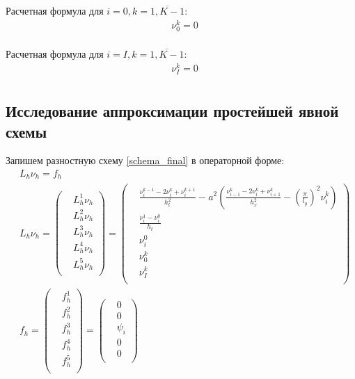 {{		Расчетная формула для $i =  0, k =  \overline{ 1, K-1}$:
		\begin{equation} \label{solution_i0}
		\begin{split}
		& \nu^{k}_0 = 0 \\
		\end{split}
		\end{equation}
		
		Расчетная формула для $i =  I, k =  \overline{ 1, K-1}$:
		\begin{equation} \label{solution_i0}
		\begin{split}
		& \nu^{k}_I = 0 \\
		\end{split}
		\end{equation}
}

	\subsection{Исследование аппроксимации простейшей явной схемы}{
		Запишем разностную схему \eqref{schema_final} в операторной форме:
		\begin{equation}\label{operator_form}
			\begin{split}
			& L_h\nu_h = f_h \\
			& L_h\nu_h = 
			\left(\begin{split}
				& L^1_h\nu_h \\
				& L^2_h\nu_h \\ 
				& L^3_h\nu_h \\ 
				& L^4_h\nu_h \\ 
				& L^5_h\nu_h \\ 
				\end{split}
			\right) 
			=
			\left(\begin{split}
				&\frac{\nu^{k-1}_i - 2\nu^{k}_i + \nu^{k+1}_i}{h_t^2} - a^2\left(\frac{\nu^{k}_{i-1} - 2\nu^{k}_i + \nu^{k}_{i+1}}{h_x^2} - \left(\frac{\pi}{l_y}\right)^2 \nu^{k}_i\right)\\
				& \frac{\nu^1_i - \nu^0_i}{h_t} \\ 
				& \nu^0_i \\
				& \nu^k_0 \\
				& \nu^k_I \\
				\end{split}
			\right) \\
			& f_h = 
			\left(\begin{split}
				& f^1_h \\
				& f^2_h \\
				& f^3_h \\
				& f^4_h \\
				& f^5_h \\
				\end{split}
			\right) 
			=
			\left(\begin{split}
				& 0 \\
				& 0 \\
				& \psi_i \\
				& 0 \\
				& 0 \\
				\end{split}
			\right) 
			\end{split}
		\end{equation}
		
}}
